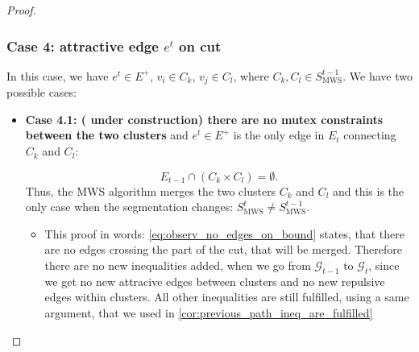 \begin{proof}


\subsubsection*{Case 4: attractive edge $e^t$ on cut}

In this case, we have $e^{t}\in E^{+}$, $v_{i}\in C_{k}$,
$v_{j}\in C_{l}$, where $C_{k},C_{l}\in S_{\mathrm{MWS}}^{t-1}$. We
have two possible cases:

\begin{itemize}

\item \textbf{Case 4.1: ({\color{red} under construction}) there are no mutex constraints between the two clusters} and $e^t\in E^+$ is the only edge in $E_t$ connecting $C_k$ and $C_l$: 

\begin{equation}
 E_{t-1}\cap\left(C_{k}\times C_{l}\right) = \emptyset. \label{eq:observ_no_edges_on_bound}
\end{equation}
Thus, the MWS algorithm merges the two clusters $C_{k}$ and $C_{l}$ and this is the only case when the segmentation changes: $S_{\mathrm{MWS}}^{t} \neq S_{\mathrm{MWS}}^{t-1}$. 

\begin{itemize}
    \item This proof in words:
    \autoref{eq:observ_no_edges_on_bound} states, that there are no edges crossing the part of the cut, that will be merged.
    Therefore there are no new inequalities added, when we go from $\mathcal{G}_{t-1}$ to $\mathcal{G}_{t}$, since we get no new attracive edges between clusters and no new repulsive edges within clusters.
    All other inequalities are still fulfilled, using a same argument, that we used in \autoref{cor:previous_path_ineq_are_fulfilled}
\end{itemize}


\end{itemize}
\end{proof}
